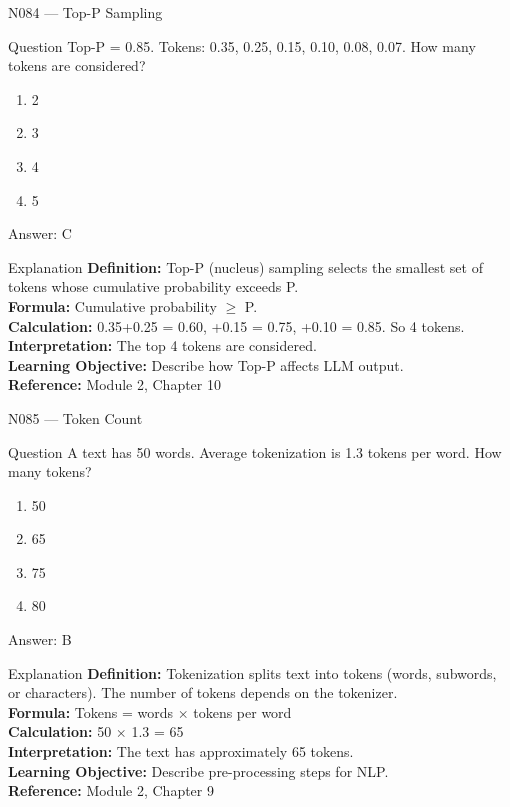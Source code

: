 \documentclass[aspectratio=169,8pt]{beamer}
\begin{document}
	\begin{frame}{N084 --- Top-P Sampling}
		\begin{block}{Question}
			Top-P = 0.85. Tokens: 0.35, 0.25, 0.15, 0.10, 0.08, 0.07. How many tokens are considered?
			\begin{enumerate}
				\item 2
				\item 3
				\item 4
				\item 5
			\end{enumerate}
		\end{block}
		\begin{exampleblock}{Answer: C}\end{exampleblock}
		\begin{block}{Explanation}
			\textbf{Definition:} Top-P (nucleus) sampling selects the smallest set of tokens whose cumulative probability exceeds P.\\
			\textbf{Formula:} Cumulative probability $\geq$ P.\\
			\textbf{Calculation:} 0.35+0.25 = 0.60, +0.15 = 0.75, +0.10 = 0.85. So 4 tokens.\\
			\textbf{Interpretation:} The top 4 tokens are considered.\\
			\textbf{Learning Objective:} Describe how Top-P affects LLM output.\\
			\textbf{Reference:} Module 2, Chapter 10
		\end{block}
	\end{frame}
	
	\begin{frame}{N085 --- Token Count}
		\begin{block}{Question}
			A text has 50 words. Average tokenization is 1.3 tokens per word. How many tokens?
			\begin{enumerate}
				\item 50
				\item 65
				\item 75
				\item 80
			\end{enumerate}
		\end{block}
		\begin{exampleblock}{Answer: B}\end{exampleblock}
		\begin{block}{Explanation}
			\textbf{Definition:} Tokenization splits text into tokens (words, subwords, or characters). The number of tokens depends on the tokenizer.\\
			\textbf{Formula:} Tokens = words $\times$ tokens per word\\
			\textbf{Calculation:} 50 $\times$ 1.3 = 65\\
			\textbf{Interpretation:} The text has approximately 65 tokens.\\
			\textbf{Learning Objective:} Describe pre-processing steps for NLP.\\
			\textbf{Reference:} Module 2, Chapter 9
		\end{block}
	\end{frame}
	
\end{document}
